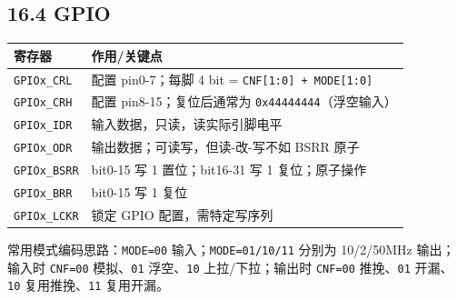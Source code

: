 \documentclass[UTF8,zihao=-5]{ctexart}
\renewcommand{\arraystretch}{0.9}
\begin{document}
\begin{multicols*}{2}
\subsection*{16.4 GPIO}
{\scriptsize\setlength{\tabcolsep}{1.8pt}\renewcommand{\arraystretch}{0.88}%
\begin{tabularx}{\linewidth}{@{}*{2}{Y}@{}}
\toprule
\textbf{寄存器} & \textbf{作用/关键点} \\
\midrule
\texttt{GPIOx\_CRL} & 配置 pin0-7；每脚 4 bit = \texttt{CNF[1:0] + MODE[1:0]} \\
\texttt{GPIOx\_CRH} & 配置 pin8-15；复位后通常为 \texttt{0x44444444}（浮空输入） \\
\texttt{GPIOx\_IDR} & 输入数据，只读，读实际引脚电平 \\
\texttt{GPIOx\_ODR} & 输出数据；可读写，但读-改-写不如 BSRR 原子 \\
\texttt{GPIOx\_BSRR} & bit0-15 写 1 置位；bit16-31 写 1 复位；原子操作 \\
\texttt{GPIOx\_BRR} & bit0-15 写 1 复位 \\
\texttt{GPIOx\_LCKR} & 锁定 GPIO 配置，需特定写序列 \\
\bottomrule
\end{tabularx}}
常用模式编码思路：\texttt{MODE=00} 输入；\texttt{MODE=01/10/11} 分别为 10/2/50MHz 输出；输入时 \texttt{CNF=00} 模拟、\texttt{01} 浮空、\texttt{10} 上拉/下拉；输出时 \texttt{CNF=00} 推挽、\texttt{01} 开漏、\texttt{10} 复用推挽、\texttt{11} 复用开漏。\par

\end{multicols*}
\end{document}
